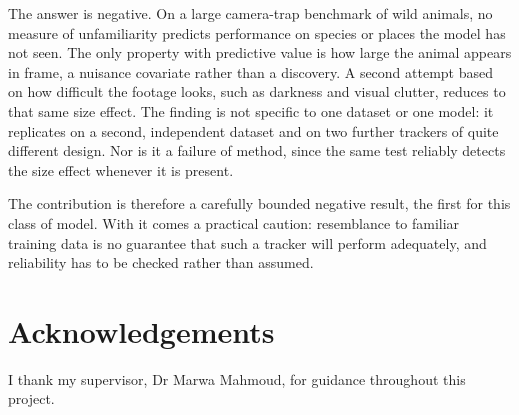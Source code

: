 \documentclass[11pt,a4paper]{report}
\begin{document}
The answer is negative. On a large camera-trap benchmark of wild animals, no measure of unfamiliarity
predicts performance on species or places the model has not seen. The only property with predictive value is
how large the animal appears in frame, a nuisance covariate rather than a discovery. A second attempt based
on how difficult the footage looks, such as darkness and visual clutter, reduces to that same size effect.
The finding is not specific to one dataset or one model: it replicates on a second, independent dataset and
on two further trackers of quite different design. Nor is it a failure of method, since the same test
reliably detects the size effect whenever it is present.

The contribution is therefore a carefully bounded negative result, the first for this class of model. With
it comes a practical caution: resemblance to familiar training data is no guarantee that such a tracker will
perform adequately, and reliability has to be checked rather than assumed.

\chapter*{Acknowledgements}
I thank my supervisor, Dr Marwa Mahmoud, for guidance throughout this project.

\tableofcontents
\listoffigures
\listoftables

\end{document}
